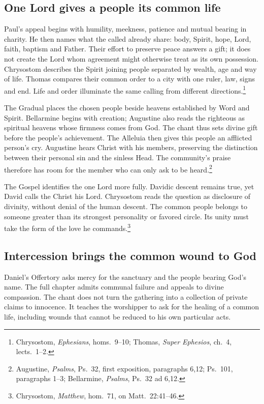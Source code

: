 \subsection{One Lord gives a people its common life}
Paul's appeal begins with humility, meekness, patience and mutual bearing in charity. He then names what the called already share: body, Spirit, hope, Lord, faith, baptism and Father. Their effort to preserve peace answers a gift; it does not create the Lord whom agreement might otherwise treat as its own possession. Chrysostom describes the Spirit joining people separated by wealth, age and way of life. Thomas compares their common order to a city with one ruler, law, signs and end. Life and order illuminate the same calling from different directions.\footnote{Chrysostom, \textit{Ephesians}, homs.~9--10; Thomas, \textit{Super Ephesios}, ch.~4, lects.~1--2.}

The Gradual places the chosen people beside heavens established by Word and Spirit. Bellarmine begins with creation; Augustine also reads the righteous as spiritual heavens whose firmness comes from God. The chant thus sets divine gift before the people's achievement. The Alleluia then gives this people an afflicted person's cry. Augustine hears Christ with his members, preserving the distinction between their personal sin and the sinless Head. The community's praise therefore has room for the member who can only ask to be heard.\footnote{Augustine, \textit{Psalms}, Ps.~32, first exposition, paragraphs 6,12; Ps.~101, paragraphs 1--3; Bellarmine, \textit{Psalms}, Ps.~32 ad 6,12.}

The Gospel identifies the one Lord more fully. Davidic descent remains true, yet David calls the Christ his Lord. Chrysostom reads the question as disclosure of divinity, without denial of the human descent. The common people belongs to someone greater than its strongest personality or favored circle. Its unity must take the form of the love he commands.\footnote{Chrysostom, \textit{Matthew}, hom.~71, on Matt.~22:41--46.}
\clearpage

\subsection{Intercession brings the common wound to God}
Daniel's Offertory asks mercy for the sanctuary and the people bearing God's name. The full chapter admits communal failure and appeals to divine compassion. The chant does not turn the gathering into a collection of private claims to innocence. It teaches the worshipper to ask for the healing of a common life, including wounds that cannot be reduced to his own particular acts.

